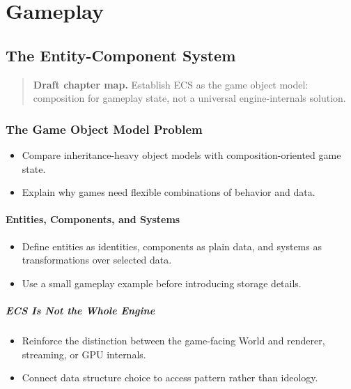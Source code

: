 \documentclass[
  11pt,
  letterpaper,
  DIV=11,
  numbers=noendperiod,
  twoside,
  open=right]{scrreprt}
\providecommand{\tightlist}{%
  \setlength{\itemsep}{0pt}\setlength{\parskip}{0pt}}
\begin{document}
\part{Gameplay}

\chapter{The Entity-Component System}\label{the-entity-component-system}

\begin{quote}
\textbf{Draft chapter map.} Establish ECS as the game object model:
composition for gameplay state, not a universal engine-internals
solution.
\end{quote}

\section{The Game Object Model
Problem}\label{the-game-object-model-problem}

\begin{itemize}
\tightlist
\item
  Compare inheritance-heavy object models with composition-oriented game
  state.
\item
  Explain why games need flexible combinations of behavior and data.
\end{itemize}

\subsection{Entities, Components, and
Systems}\label{entities-components-and-systems}

\begin{itemize}
\tightlist
\item
  Define entities as identities, components as plain data, and systems
  as transformations over selected data.
\item
  Use a small gameplay example before introducing storage details.
\end{itemize}

\subsubsection{ECS Is Not the Whole
Engine}\label{ecs-is-not-the-whole-engine}

\begin{itemize}
\tightlist
\item
  Reinforce the distinction between the game-facing World and renderer,
  streaming, or GPU internals.
\item
  Connect data structure choice to access pattern rather than ideology.
\end{itemize}
\end{document}
